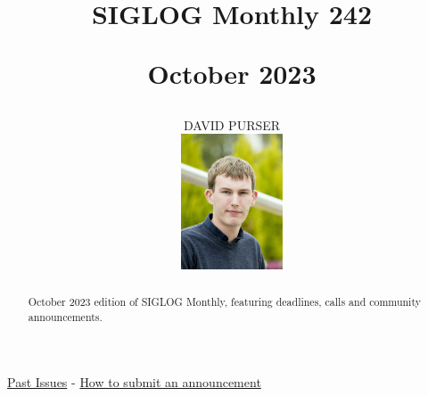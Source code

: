 \documentclass[prodmode,acmtecs]{acmsmall} %
\newcounter{colstart}
\begin{document}
\setcounter{colstart}{\thepage}

\title{{\huge\sc SIGLOG Monthly 242}

 October 2023}
\author{DAVID PURSER
\vspace*{-2.6cm}\begin{flushright}\includegraphics[width=30mm]{dp}\end{flushright}
}

\begin{abstract}
October 2023 edition of SIGLOG Monthly, featuring deadlines, calls and community announcements.
\end{abstract}


\maketitlee

\href{https://lics.siglog.org/newsletters/}{Past Issues}
 - 
\href{https://lics.siglog.org/newsletters/inst.html}{How to submit an announcement}
\end{document}
